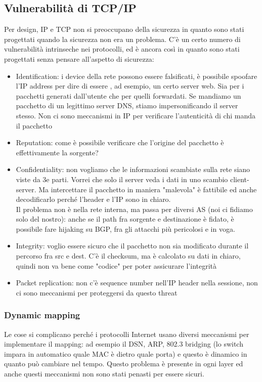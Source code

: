 \documentclass[12pt, oneside]{extbook} %
\begin{document}
\subsection{Vulnerabilità di TCP/IP}
Per design, IP e TCP non si preoccupano della sicurezza in quanto sono stati progettati quando la sicurezza non era un problema. C'è un certo numero di vulnerabilità intrinseche nei protocolli, ed è ancora così in quanto sono stati progettati senza pensare all'aspetto di sicurezza:
\begin{itemize}
\item Identification: i device della rete possono essere falsificati, è possibile spoofare l'IP address per dire di essere , ad esempio, un certo server web. Sia per i pacchetti generati dall'utente che per quelli forwardati. Se mandiamo un pacchetto di un legittimo server DNS, stiamo impersonificando il server stesso. Non ci sono meccanismi in IP per verificare l'autenticità di chi manda il pacchetto
\item Reputation: come è possibile verificare che l'origine del pacchetto è effettivamente la sorgente?
\item Confidentiality: non vogliamo che le informazioni scambiate sulla rete siano viste da 3e parti. Vorrei che solo il server veda i dati in uno scambio client-server. Ma intercettare il pacchetto in maniera "malevola" è fattibile ed anche decodificarlo perché l'header e l'IP sono in chiaro.\\ Il problema non è nella rete interna, ma passa per diversi AS (noi ci fidiamo solo del nostro): anche se il path fra sorgente e destinazione è fidato, è possibile fare hijaking su BGP, fra gli attacchi più pericolosi e in voga.
\item Integrity: voglio essere sicuro che il pacchetto non sia modificato durante il percorso fra src e dest. C'è il checksum, ma è calcolato su dati in chiaro, quindi non va bene come "codice" per poter assicurare l'integrità
\item Packet replication: non c'è sequence number nell'IP header nella sessione, non ci sono meccanismi per proteggersi da questo threat
\end{itemize}

\subsubsection{Dynamic mapping}
Le cose si complicano perché i protocolli Internet usano diversi meccanismi per implementare il mapping: ad esempio il DSN, ARP, 802.3 bridging (lo switch impara in automatico quale MAC è dietro quale porta) e questo è dinamico in quanto può cambiare nel tempo. Questo problema è presente in ogni layer ed anche questi meccanismi non sono stati penasti per essere sicuri.
\end{document}
